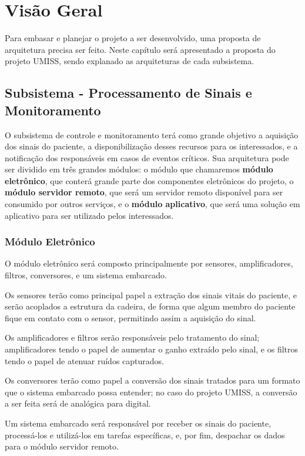 \chapter{Visão Geral}

Para embasar e planejar o projeto a ser desenvolvido, uma proposta de
arquitetura precisa ser feito. Neste capítulo será apresentado a proposta do projeto UMISS,
sendo explanado as arquiteturas de cada subsistema.

\section{Subsistema - Processamento de Sinais e Monitoramento}

O subsistema de controle e monitoramento terá como grande objetivo a aquisição
dos sinais do paciente, a disponibilização desses recursos para os
interessados, e a notificação dos responsáveis em casos de eventos críticos.
Sua arquitetura pode ser dividido em três grandes
módulos: o módulo que chamaremos \textbf{módulo eletrônico}, que conterá
grande parte dos componentes eletrônicos do projeto,
o \textbf{módulo servidor remoto}, que será um servidor remoto disponível
para ser consumido por outros serviços, e o \textbf{módulo aplicativo},
que será uma solução em aplicativo para ser utilizado pelos interessados.

\subsection{Módulo Eletrônico}
O módulo eletrônico será composto principalmente por sensores, amplificadores,
filtros, conversores, e um sistema embarcado.

Os sensores terão como principal papel a extração dos sinais vitais do
paciente, e serão acoplados a estrutura da cadeira, de forma que algum
membro do paciente fique em contato com o sensor, permitindo assim a
aquisição do sinal.

Os amplificadores e filtros serão responsáveis pelo tratamento do sinal;
amplificadores tendo o papel de aumentar o ganho extraído pelo sinal,
e os filtros tendo o papel de atenuar ruídos capturados.

Os conversores terão como papel a conversão dos sinais tratados para um formato
que o sistema embarcado possa entender; no caso do projeto UMISS, a conversão
a ser feita será de analógica para digital.

Um sistema embarcado será responsável por receber os sinais do paciente,
processá-los e utilizá-los em tarefas específicas, e, por fim, despachar os
dados para o módulo servidor remoto.

